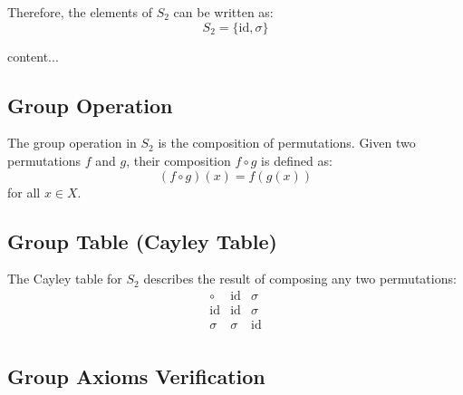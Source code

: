 \begin{exercise}
\begin{itemize}
{}
\end{itemize}

Therefore, the elements of \( S_2 \) can be written as:
\[
S_2 = \{ \text{id}, \sigma \}
\]
\end{exercise}

\vspace{12pt}
\begin{exercise}
	content...
\end{exercise}

\subsection*{Group Operation}

The group operation in \( S_2 \) is the composition of permutations. Given two permutations \( f \) and \( g \), their composition \( f \circ g \) is defined as:
\[
(f \circ g)(x) = f(g(x))
\]
for all \( x \in X \).

\subsection*{Group Table (Cayley Table)}

The Cayley table for \( S_2 \) describes the result of composing any two permutations:
\[
\begin{array}{c|cc}
	\circ & \text{id} & \sigma \\
	\hline
	\text{id} & \text{id} & \sigma \\
	\sigma & \sigma & \text{id} \\
\end{array}
\]

\subsection*{Group Axioms Verification}

